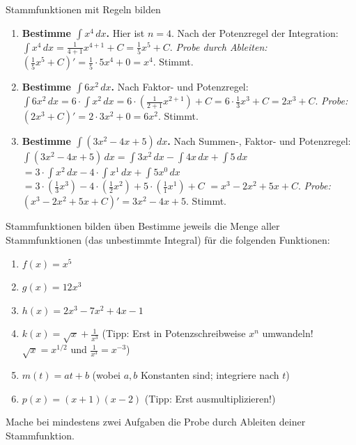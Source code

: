 \begin{beispielumgebung}{Stammfunktionen mit Regeln bilden}
\begin{enumerate}
    \item \textbf{Bestimme $\int x^4 \,dx$.}
        Hier ist $n=4$. Nach der Potenzregel der Integration:
        $\int x^4 \,dx = \frac{1}{4+1}x^{4+1} + C = \frac{1}{5}x^5 + C$.
        \textit{Probe durch Ableiten:} $(\frac{1}{5}x^5+C)' = \frac{1}{5} \cdot 5x^4 + 0 = x^4$. Stimmt.

    \item \textbf{Bestimme $\int 6x^2 \,dx$.}
        Nach Faktor- und Potenzregel:
        $\int 6x^2 \,dx = 6 \cdot \int x^2 \,dx = 6 \cdot \left(\frac{1}{2+1}x^{2+1}\right) + C = 6 \cdot \frac{1}{3}x^3 + C = 2x^3 + C$.
        \textit{Probe:} $(2x^3+C)' = 2 \cdot 3x^2 + 0 = 6x^2$. Stimmt.

    \item \textbf{Bestimme $\int (3x^2 - 4x + 5) \,dx$.}
        Nach Summen-, Faktor- und Potenzregel:
        $\int (3x^2 - 4x + 5) \,dx = \int 3x^2 \,dx - \int 4x \,dx + \int 5 \,dx$
        $= 3 \cdot \int x^2 \,dx - 4 \cdot \int x^1 \,dx + \int 5x^0 \,dx$
        $= 3 \cdot \left(\frac{1}{3}x^3\right) - 4 \cdot \left(\frac{1}{2}x^2\right) + 5 \cdot \left(\frac{1}{1}x^1\right) + C$
        $= x^3 - 2x^2 + 5x + C$.
        \textit{Probe:} $(x^3 - 2x^2 + 5x + C)' = 3x^2 - 4x + 5$. Stimmt.
\end{enumerate}
\end{beispielumgebung}

\begin{aufgabenumgebung}{Stammfunktionen bilden üben}
Bestimme jeweils die Menge aller Stammfunktionen (das unbestimmte Integral) für die folgenden Funktionen:
\begin{enumerate}
    \item $f(x) = x^5$
    \item $g(x) = 12x^3$
    \item $h(x) = 2x^3 - 7x^2 + 4x - 1$
    \item $k(x) = \sqrt{x} + \frac{1}{x^3}$ (Tipp: Erst in Potenzschreibweise $x^n$ umwandeln! $\sqrt{x}=x^{1/2}$ und $\frac{1}{x^3}=x^{-3}$)
    \item $m(t) = at+b$ (wobei $a,b$ Konstanten sind; integriere nach $t$)
    \item $p(x) = (x+1)(x-2)$ (Tipp: Erst ausmultiplizieren!)
\end{enumerate}
Mache bei mindestens zwei Aufgaben die Probe durch Ableiten deiner Stammfunktion.
\end{aufgabenumgebung}

